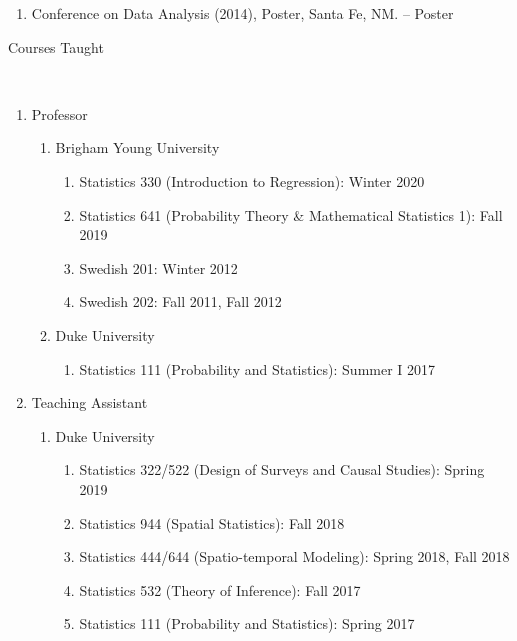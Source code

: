 \documentclass[12pt]{article}
\newcommand{\head}[1]{ %
    \bigskip %
    \begin{large}\begin{bf}{#1}\end{bf}\end{large} %

    \ \\ [-1.3cm] %

    \hrulefill}
\begin{document}
\begin{enumerate}[label=$\bullet$]
\begin{enumerate}[label=$\cdot$]
\item Conference on Data Analysis (2014), Poster, Santa Fe, NM. --  Poster
\end{enumerate}
\end{enumerate}

\head{Courses Taught}

\begin{enumerate}[label=$\bullet$]
\item Professor
\begin{enumerate}[label=$\cdot$]
\item Brigham Young University
\begin{enumerate}[label=$\cdot$]
\item Statistics 330 (Introduction to Regression): Winter 2020
\item Statistics 641 (Probability Theory \& Mathematical Statistics 1): Fall 2019
\item Swedish 201: Winter 2012 
\item Swedish 202: Fall 2011, Fall 2012
\end{enumerate}
\item Duke University
\begin{enumerate}[label=$\cdot$]
\item Statistics 111 (Probability and Statistics): Summer I 2017
\end{enumerate}
\end{enumerate}
\item Teaching Assistant
\begin{enumerate}[label=$\cdot$]
\item Duke University
\begin{enumerate}[label=$\cdot$]
\item Statistics 322/522 (Design of Surveys and Causal Studies): Spring 2019
\item Statistics 944 (Spatial Statistics): Fall 2018
\item Statistics 444/644 (Spatio-temporal Modeling): Spring 2018, Fall 2018
\item Statistics 532 (Theory of Inference): Fall 2017
\item Statistics 111 (Probability and Statistics): Spring 2017 
\end{enumerate}
\end{enumerate}
\end{enumerate}
\end{document}
